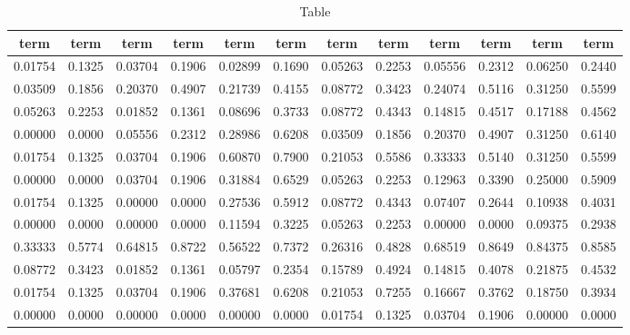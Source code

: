 %
\begin{table}[hptb]
\caption{Table\label{tmp}}
\begin{center}
\begin{tabular}{|c|c|c|c|c|c|c|c|c|c|c|c|} \hline
\multicolumn{1}{|c|}{term}&\multicolumn{1}{c|}{term}&\multicolumn{1}{c|}{term}&\multicolumn{1}{c|}{term}&\multicolumn{1}{c|}{term}&\multicolumn{1}{c|}{term}&\multicolumn{1}{c|}{term}&\multicolumn{1}{c|}{term}&\multicolumn{1}{c|}{term}&\multicolumn{1}{c|}{term}&\multicolumn{1}{c|}{term}&\multicolumn{1}{c|}{term}\\ \hline
0.01754&0.1325&0.03704&0.1906&0.02899&0.1690&0.05263&0.2253&0.05556&0.2312&0.06250&0.2440\\ 
0.03509&0.1856&0.20370&0.4907&0.21739&0.4155&0.08772&0.3423&0.24074&0.5116&0.31250&0.5599\\ 
0.05263&0.2253&0.01852&0.1361&0.08696&0.3733&0.08772&0.4343&0.14815&0.4517&0.17188&0.4562\\ 
0.00000&0.0000&0.05556&0.2312&0.28986&0.6208&0.03509&0.1856&0.20370&0.4907&0.31250&0.6140\\ 
0.01754&0.1325&0.03704&0.1906&0.60870&0.7900&0.21053&0.5586&0.33333&0.5140&0.31250&0.5599\\ 
0.00000&0.0000&0.03704&0.1906&0.31884&0.6529&0.05263&0.2253&0.12963&0.3390&0.25000&0.5909\\ 
0.01754&0.1325&0.00000&0.0000&0.27536&0.5912&0.08772&0.4343&0.07407&0.2644&0.10938&0.4031\\ 
0.00000&0.0000&0.00000&0.0000&0.11594&0.3225&0.05263&0.2253&0.00000&0.0000&0.09375&0.2938\\ 
0.33333&0.5774&0.64815&0.8722&0.56522&0.7372&0.26316&0.4828&0.68519&0.8649&0.84375&0.8585\\ 
0.08772&0.3423&0.01852&0.1361&0.05797&0.2354&0.15789&0.4924&0.14815&0.4078&0.21875&0.4532\\ 
0.01754&0.1325&0.03704&0.1906&0.37681&0.6208&0.21053&0.7255&0.16667&0.3762&0.18750&0.3934\\ 
0.00000&0.0000&0.00000&0.0000&0.00000&0.0000&0.01754&0.1325&0.03704&0.1906&0.00000&0.0000\\ 
\hline
\end{tabular}
\vspace{3mm}
\end{center}
\end{table}
